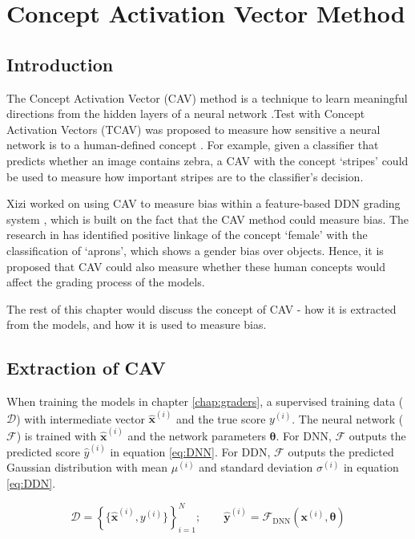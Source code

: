 \chapter{Concept Activation Vector Method} \label{chap:cav}

\section{Introduction}
The Concept Activation Vector (CAV) method is a technique to learn meaningful directions from the hidden layers of a neural network \cite{cav_def}.Test with Concept Activation Vectors (TCAV)  was proposed to measure how sensitive a neural network is to a human-defined concept \cite{tcav}. For example, given a classifier that predicts whether an image contains zebra, a CAV with the concept `stripes' could be used to measure how important stripes are to the classifier's decision.

Xizi worked on using CAV to measure bias within a feature-based DDN grading system \cite{feature_bias}, which is built on the fact that the CAV method could measure bias. The research in \cite{tcav} has identified positive linkage of the concept `female' with the classification of `aprons', which shows a gender bias over objects. Hence, it is proposed that CAV could also measure whether these human concepts would affect the grading process of the models.

The rest of this chapter would discuss the concept of CAV - how it is extracted from the models, and how it is used to measure bias.

\section{Extraction of CAV}
When training the models in chapter \ref{chap:graders}, a supervised training data ($\mathcal{D}$) with intermediate vector $\mathbf{\hat{x}}^{(i)}$ and the true score $y^{(i)}$. The neural network ($\mathcal{F}$) is trained with $\mathbf{\hat{x}}^{(i)}$ and the network parameters $\boldsymbol{\theta}$. For DNN, $\mathcal{F}$ outputs the predicted score $\hat{y}^{(i)}$ in equation \ref{eq:DNN}. For DDN, $\mathcal{F}$ outputs the predicted Gaussian distribution with mean $\mu^{(i)}$ and standard deviation $\sigma^{(i)}$ in equation \ref{eq:DDN}.

\begin{equation} \label{eq:DNN}
    \mathcal{D} = \left\{\{\mathbf{\hat{x}}^{(i)},y^{(i)}\}\right\}_{i=1}^{N}; \qquad \mathbf{\hat{y}}^{(i)} = \mathcal{F}_{\text{DNN}}(\mathbf{x}^{(i)}, \boldsymbol{\theta})
\end{equation}


